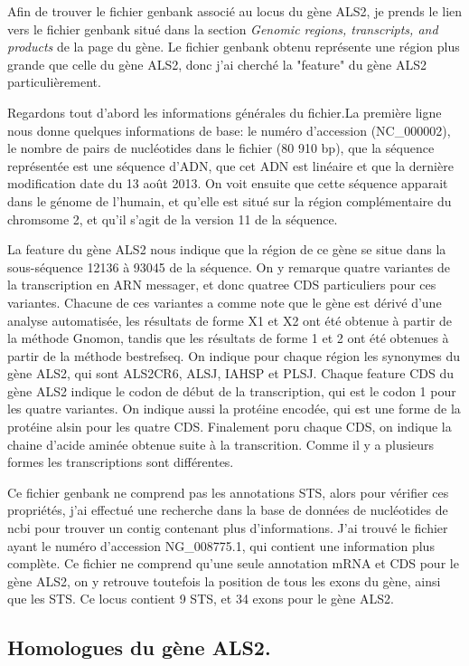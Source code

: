 \documentclass[10.8pt]{article} %
\begin{document}
Afin de trouver le fichier genbank associé au locus du gène ALS2, je prends le lien vers le fichier genbank situé dans la section
\emph{Genomic regions, transcripts, and products} de la page du gène. Le fichier genbank obtenu représente une région plus
grande que celle du gène ALS2, donc j'ai cherché la "feature" du gène ALS2 particulièrement.

Regardons tout d'abord les informations générales du fichier.La première ligne nous donne quelques informations de base: le numéro
d'accession (NC\_000002), le nombre de pairs de nucléotides dans le fichier (80 910 bp), que la séquence représentée est une séquence
d'ADN, que cet ADN est linéaire et que la dernière modification date du 13 août 2013. On voit ensuite que cette séquence apparait 
dans le génome de l'humain, et qu'elle est situé sur la région complémentaire du chromsome 2, et qu'il s'agit de la version 11 de la
séquence.

La feature du gène ALS2 nous indique que la région de ce gène se situe dans la sous-séquence 12136 à  93045 de la séquence. On y 
remarque quatre variantes de la transcription en ARN messager, et donc quatree CDS particuliers pour ces variantes.
Chacune de ces variantes a comme note que le gène est dérivé d'une analyse automatisée, les résultats de forme X1 et X2 ont été
obtenue à partir de la méthode Gnomon, tandis que les résultats de forme 1 et 2 ont été obtenues à partir de la méthode
bestrefseq. On indique pour chaque région les synonymes du gène ALS2, qui sont ALS2CR6, ALSJ, IAHSP et PLSJ. Chaque feature CDS
du gène ALS2 indique le codon de début de la transcription, qui est le codon 1 pour les quatre variantes. On indique aussi la
protéine encodée, qui est une forme de la protéine alsin pour les quatre CDS. Finalement poru chaque CDS, on indique la
chaine d'acide aminée obtenue suite à la transcrition. Comme il y a plusieurs formes les transcriptions sont différentes.

Ce fichier genbank ne comprend pas les annotations STS, alors pour vérifier ces propriétés, j'ai effectué une recherche dans la
base de données de nucléotides de ncbi pour trouver un contig contenant plus d'informations. J'ai trouvé le fichier ayant le
numéro d'accession NG\_008775.1, qui contient une information plus complète. Ce fichier ne comprend qu'une seule annotation mRNA
et CDS pour le gène ALS2, on y retrouve toutefois la position de tous les exons du gène, ainsi que les STS. Ce locus contient
9 STS, et 34 exons pour le gène ALS2. 

\subsection[Homologues du gène ALS2]{Homologues du gène ALS2.}
\end{document}
